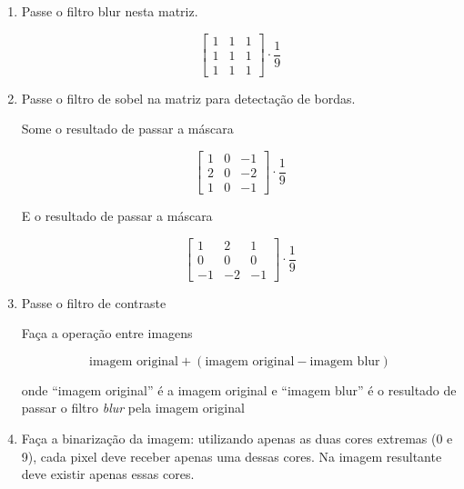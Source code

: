 \documentclass[12pt]{article}
\begin{document}
\begin{enumerate}
\begin{enumerate}

\item Passe o filtro blur nesta matriz.

\[
\begin{bmatrix}
  1 &  1 &  1 \\
  1 &  1 &  1 \\
  1 &  1 &  1 
\end{bmatrix}
\cdot\frac{1}{9}
\]

\item Passe o filtro de sobel na matriz para detectação de bordas.

Some o resultado de passar a máscara

\[
\begin{bmatrix}
  1 &  0 &  -1 \\
  2 &  0 &  -2 \\
  1 &  0 &  -1 
\end{bmatrix}
\cdot\frac{1}{9}
\]

E o resultado de passar a máscara

\[
\begin{bmatrix}
  1 &   2 &   1 \\
  0 &   0 &   0 \\
 -1 &  -2 &  -1 
\end{bmatrix}
\cdot\frac{1}{9}
\]


\item Passe o filtro de contraste

Faça a operação entre imagens

\[\mbox{imagem original} + (\mbox{imagem original} - \mbox{imagem blur})\]

onde ``imagem original'' é a imagem original e ``imagem blur'' é o resultado de passar o filtro \textit{blur} pela imagem original




\item Faça a binarização da imagem: utilizando apenas as duas cores extremas (0 e 9), cada pixel deve receber apenas uma dessas cores. 
Na imagem resultante deve existir apenas essas cores.


\end{enumerate}






\end{enumerate}
\end{document}
